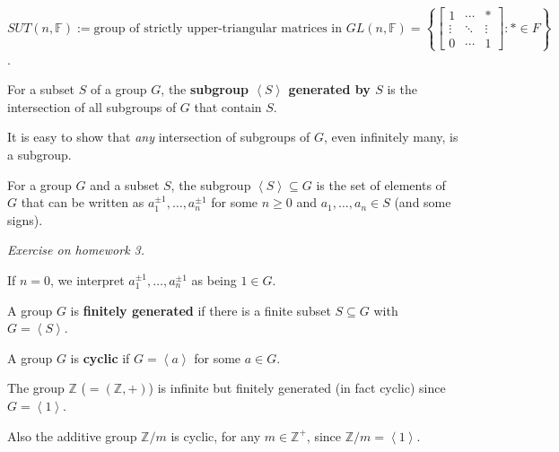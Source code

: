 \documentclass{notes}
\begin{document}
\begin{eg}
  $SUT(n, \mathbb F) := \text{group of strictly upper-triangular matrices in $GL(n, \mathbb F)$} = \left \{ \begin{bmatrix} 1 & \cdots & * \\ \vdots & \ddots & \vdots \\ 0 & \cdots & 1 \end{bmatrix} : * \in F \right \}$.
\end{eg}

\begin{defn}
  For a subset $S$ of a group $G$, the {\boldmath \bfseries subgroup $\left \langle S \right \rangle$ generated by $S$} is the intersection of all subgroups of $G$ that contain $S$.
\end{defn}

It is easy to show that \textit{any} intersection of subgroups of $G$, even infinitely many, is a subgroup.

\begin{lem}
  For a group $G$ and a subset $S$, the subgroup $\left \langle S \right \rangle \subseteq G$ is the set of elements of $G$ that can be written as $a_1^{\pm 1}, \dots, a_n^{\pm 1}$ for some $n \geq 0$ and $a_1, \dots, a_n \in S$ (and some signs).
\end{lem}

\begin{prf}
  \textit{Exercise on homework 3.}
\end{prf}

\begin{rmk}
  If $n = 0$, we interpret $a_1^{\pm 1}, \dots, a_n^{\pm 1}$ as being $1 \in G$.
\end{rmk}

\begin{defn}
  A group $G$ is {\boldmath \bfseries finitely generated} if there is a finite subset $S \subseteq G$ with $G = \left \langle S \right \rangle$.
\end{defn}

\begin{defn}
  A group $G$ is {\boldmath \bfseries cyclic} if $G = \left \langle a \right \rangle$ for some $a \in G$.
\end{defn}

\begin{eg}
  The group $\mathbb Z$ ($= (\mathbb Z, +)$) is infinite but finitely generated (in fact cyclic) since $G = \left \langle 1 \right \rangle$.

  Also the additive group $\mathbb Z / m$ is cyclic, for any $m \in \mathbb Z^+$, since $\mathbb Z / m = \left \langle 1 \right \rangle$.
\end{eg}
\end{document}
